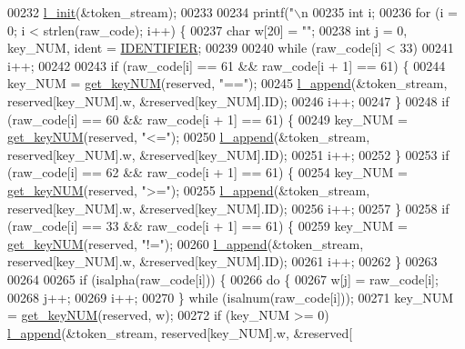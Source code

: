 \begin{DoxyCode}
{00232   \hyperlink{lexer_8c_aeaf25962d905093a69389e62796e237b}{l_init}(&token\_stream);
00233 
00234   printf(\textcolor{stringliteral}{"\(\backslash\)n%
00235   \textcolor{keywordtype}{int} i;
00236   \textcolor{keywordflow}{for} (i = 0; i < strlen(raw\_code); i++) \{
00237     \textcolor{keywordtype}{char} w[20] = \textcolor{stringliteral}{""};
00238     \textcolor{keywordtype}{int} j = 0, key\_NUM, ident = \hyperlink{lexer_8h_a3033e03f16b6d2620a2e39b45718f5b4a84f8ae2490f9e4bd2321fd21f4b0e807}{IDENTIFIER};
00239     
00240     \textcolor{keywordflow}{while} (raw\_code[i] < 33)
00241       i++;
00242 
00243     \textcolor{keywordflow}{if} (raw\_code[i] == 61 && raw\_code[i + 1] == 61) \{
00244       key\_NUM = \hyperlink{lexer_8c_a9670ac79a4525a9152a28835404e2470}{get_keyNUM}(reserved, \textcolor{stringliteral}{"=="});
00245       \hyperlink{lexer_8c_a46cdfdb54ba6b79debb3745f650bcdbe}{l_append}(&token\_stream, reserved[key\_NUM].w, &reserved[key\_NUM].ID);
00246       i++;
00247     \}
00248     \textcolor{keywordflow}{if} (raw\_code[i] == 60 && raw\_code[i + 1] == 61) \{
00249       key\_NUM = \hyperlink{lexer_8c_a9670ac79a4525a9152a28835404e2470}{get_keyNUM}(reserved, \textcolor{stringliteral}{"<="});
00250       \hyperlink{lexer_8c_a46cdfdb54ba6b79debb3745f650bcdbe}{l_append}(&token\_stream, reserved[key\_NUM].w, &reserved[key\_NUM].ID);
00251       i++;
00252     \}
00253     \textcolor{keywordflow}{if} (raw\_code[i] == 62 && raw\_code[i + 1] == 61) \{
00254       key\_NUM = \hyperlink{lexer_8c_a9670ac79a4525a9152a28835404e2470}{get_keyNUM}(reserved, \textcolor{stringliteral}{">="});
00255       \hyperlink{lexer_8c_a46cdfdb54ba6b79debb3745f650bcdbe}{l_append}(&token\_stream, reserved[key\_NUM].w, &reserved[key\_NUM].ID);
00256       i++;
00257     \}
00258     \textcolor{keywordflow}{if} (raw\_code[i] == 33 && raw\_code[i + 1] == 61) \{
00259       key\_NUM = \hyperlink{lexer_8c_a9670ac79a4525a9152a28835404e2470}{get_keyNUM}(reserved, \textcolor{stringliteral}{"!="});
00260       \hyperlink{lexer_8c_a46cdfdb54ba6b79debb3745f650bcdbe}{l_append}(&token\_stream, reserved[key\_NUM].w, &reserved[key\_NUM].ID);
00261       i++;
00262     \}
00263 
00264     
00265     \textcolor{keywordflow}{if} (isalpha(raw\_code[i])) \{
00266       \textcolor{keywordflow}{do} \{
00267         w[j] = raw\_code[i];
00268         j++;
00269         i++;
00270       \} \textcolor{keywordflow}{while} (isalnum(raw\_code[i]));
00271       key\_NUM = \hyperlink{lexer_8c_a9670ac79a4525a9152a28835404e2470}{get_keyNUM}(reserved, w);
00272       \textcolor{keywordflow}{if} (key\_NUM >= 0) \hyperlink{lexer_8c_a46cdfdb54ba6b79debb3745f650bcdbe}{l_append}(&token\_stream, reserved[key\_NUM].w, &reserved[
}}
\end{DoxyCode}
